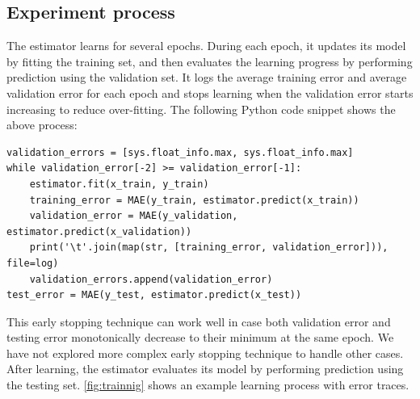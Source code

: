 \documentclass{article}
\begin{document}
\subsection{Experiment process}
The estimator learns for several epochs.
During each epoch, it updates its model by fitting the training set, and 
then evaluates the learning progress by performing prediction using the 
validation set.
It logs the average training error and average validation error for each epoch 
and stops learning when the validation error starts increasing to reduce 
over-fitting.
The following Python code snippet shows the above process:
\begin{lstlisting}
validation_errors = [sys.float_info.max, sys.float_info.max]
while validation_error[-2] >= validation_error[-1]:
	estimator.fit(x_train, y_train)
	training_error = MAE(y_train, estimator.predict(x_train))
	validation_error = MAE(y_validation, estimator.predict(x_validation))
	print('\t'.join(map(str, [training_error, validation_error])), file=log)
	validation_errors.append(validation_error)
test_error = MAE(y_test, estimator.predict(x_test))
\end{lstlisting}
This early stopping technique can work well in case both validation error and 
testing error monotonically decrease to their minimum at the same epoch.
We have not explored more complex early stopping technique to handle other 
cases.
After learning, the estimator evaluates its model by performing prediction 
using the testing set.
\autoref{fig:trainnig} shows an example learning process with error traces.
\end{document}
